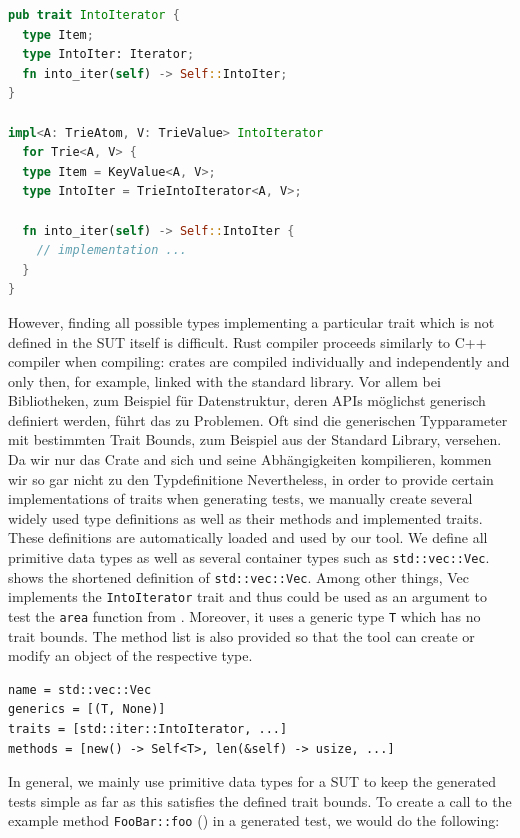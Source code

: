 \documentclass[paper=a4,%
  twoside,%
  BCOR4mm,%
  abstract=true,%
  toc=bibliography,%
  chapterprefix=true,%
  toc=bibliographynumbered,%
  open=right,%
  english,%
  pagesize=pdftex]{scrreprt}
\begin{document}
\begin{lstlisting}[language=Rust, style=boxed, caption={IntoIterator implementation in the \textbf{trying} crate}, label=lst:intoiterator-trait]
pub trait IntoIterator {
  type Item;
  type IntoIter: Iterator;
  fn into_iter(self) -> Self::IntoIter;
}

impl<A: TrieAtom, V: TrieValue> IntoIterator
  for Trie<A, V> {
  type Item = KeyValue<A, V>;
  type IntoIter = TrieIntoIterator<A, V>;

  fn into_iter(self) -> Self::IntoIter {
    // implementation ...
  }
}
\end{lstlisting}

However, finding all possible types implementing a particular trait which is not defined in the \ac{SUT} itself is difficult. Rust compiler proceeds similarly to C++ compiler when compiling: crates are compiled individually and independently and only then, for example, linked with the standard library. Vor allem bei Bibliotheken, zum Beispiel für Datenstruktur, deren \acp{API} möglichst generisch definiert werden, führt das zu Problemen. Oft sind die generischen Typparameter mit bestimmten Trait Bounds, zum Beispiel aus der Standard Library, versehen. Da wir nur das Crate and sich und seine Abhängigkeiten kompilieren, kommen wir so gar nicht zu den Typdefinitione Nevertheless, in order to provide certain implementations of traits when generating tests, we manually create several widely used type definitions as well as their methods and implemented traits. These definitions are automatically loaded and used by our tool. We define all primitive data types as well as several container types such as \lstinline{std::vec::Vec}.  shows the shortened definition of \lstinline{std::vec::Vec}. Among other things, Vec implements the \lstinline{IntoIterator} trait and thus could be used as an argument to test the \lstinline{area} function from . Moreover, it uses a generic type \lstinline{T} which has no trait bounds. The method list is also provided so that the tool can create or modify an object of the respective type.

\begin{lstlisting}[language={}, style=boxed, caption={std::vec::Vec type definition}, label=lst:vec-definition]
name = std::vec::Vec
generics = [(T, None)]
traits = [std::iter::IntoIterator, ...]
methods = [new() -> Self<T>, len(&self) -> usize, ...]
\end{lstlisting}

In general, we mainly use primitive data types for a \ac{SUT} to keep the generated tests simple as far as this satisfies the defined trait bounds. To create a call to the example method \lstinline{FooBar::foo} () in a generated test, we would do the following:
\end{document}
